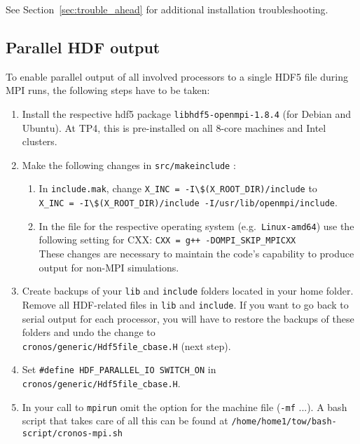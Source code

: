 
See Section~\ref{sec:trouble_ahead} for additional installation
troubleshooting.


\subsection{Parallel HDF output}
To enable parallel output of all involved processors to a single HDF5 file
during MPI runs, the following steps have to be taken:
\begin{enumerate}
\item Install the respective hdf5 package {\tt libhdf5-openmpi-1.8.4}
  (for Debian and Ubuntu). At TP4, this is pre-installed on all 8-core
  machines and Intel clusters.
\item Make the following changes in {\tt src/makeinclude} :
  \begin{enumerate}
  \item In {\tt include.mak}, change
    \verb+X_INC = -I\$(X_ROOT_DIR)/include+ to \\
    \verb+X_INC = -I\$(X_ROOT_DIR)/include -I/usr/lib/openmpi/include+. 
  \item In the file for the respective operating system (e.g.\
    {\tt Linux-amd64}) use the following setting for CXX:
    {\tt CXX = g++ -DOMPI\_SKIP\_MPICXX} \\
    These changes are necessary to maintain the code's capability to produce
    output for non-MPI simulations.
  \end{enumerate}
\item Create backups of your {\tt lib} and {\tt include} folders located in
  your home folder. Remove all HDF-related files in {\tt lib} and
  {\tt include}. If you want to go back to serial output for each processor,
  you will have to restore the backups of these folders and undo the change
  to \\ {\tt cronos/generic/Hdf5file\_cbase.H} (next step).
\item Set {\tt \#define HDF\_PARALLEL\_IO SWITCH\_ON} in \\
  {\tt cronos/generic/Hdf5file\_cbase.H}.
\item In your call to {\tt mpirun} omit the option for the machine file
  ({\tt -mf} ...). A bash script that takes care of all this can be found
  at {\tt /home/home1/tow/bash-script/cronos-mpi.sh}
\end{enumerate}
